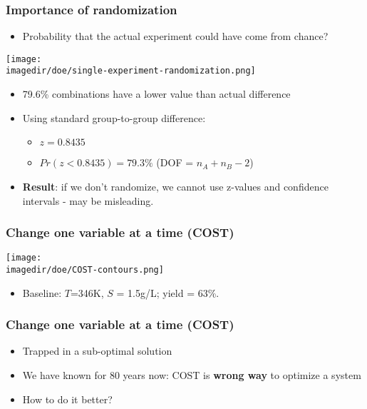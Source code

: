\begin{frame}\frametitle{Importance of randomization}
	\begin{itemize}
		\item	Probability that the actual experiment could have come from chance?
	\end{itemize}
	\begin{center}
		\texttt{[image: \\imagedir/doe/single-experiment-randomization.png]}
	\end{center}
	\begin{itemize}
		\item	79.6\% combinations have a lower value than actual difference
		\item	Using standard group-to-group difference:
		\begin{itemize}
			\item	$z = 0.8435$
			\item	$Pr(z<0.8435) = 79.3\%$ (DOF = $n_A + n_B - 2$)
		\end{itemize}
	\end{itemize}
	\begin{itemize}
		\item	\textbf{Result}: if we don't randomize, we cannot use z-values and confidence intervals - may be misleading.
	\end{itemize}
\end{frame}

\begin{frame}\frametitle{Change one variable at a time (COST)}
	\begin{center}
		\texttt{[image: \\imagedir/doe/COST-contours.png]}
	\end{center}
	\begin{itemize}
		\item	Baseline: $T$=346K, $S$ = 1.5g/L; yield = 63\%.
	\end{itemize}
\end{frame}

\begin{frame}\frametitle{Change one variable at a time (COST)}
	\begin{itemize}
		\item	Trapped in a sub-optimal solution
		\item	We have known for 80 years now: COST is \textbf{wrong way} to optimize a system
		\item	How to do it better?
	\end{itemize}
\end{frame}

